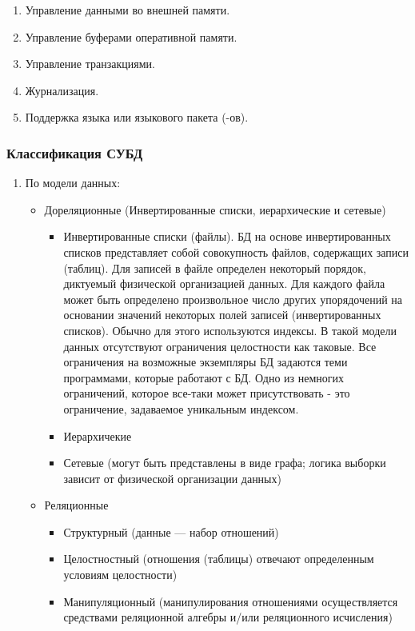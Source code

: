 \begin{enumerate}
	\item Управление данными во внешней памяти.
	\item Управление буферами оперативной памяти.
	\item Управление транзакциями.
	\item Журнализация.
	\item Поддержка языка или языкового пакета (-ов).
\end{enumerate}

\subsubsection{Классификация СУБД}
\begin{enumerate}
	\item По модели данных:
	\begin{itemize}
		\item Дореляционные (Инвертированные списки, иерархические и сетевые)
		\begin{itemize}
			\item Инвертированные списки (файлы). БД на основе инвертированных списков представляет собой совокупность файлов, содержащих записи (таблиц). Для записей в файле определен некоторый порядок, диктуемый физической организацией данных. Для каждого файла может быть определено произвольное число других упорядочений на основании значений некоторых полей записей (инвертированных списков). Обычно для этого используются индексы. В такой модели данных отсутствуют ограничения целостности как таковые. Все ограничения на возможные экземпляры БД задаются теми программами, которые работают с БД. Одно из немногих ограничений, которое все-таки может присутствовать - это ограничение, задаваемое уникальным индексом. 
			\item Иерархичекие
			\item Сетевые (могут быть представлены в виде графа; логика выборки зависит от физической организации данных)
		\end{itemize}
		\item Реляционные
		\begin{itemize}
			\item Структурный (данные --- набор отношений)
			\item Целостностный (отношения (таблицы) отвечают определенным условиям целостности)
			\item Манипуляционный (манипулирования отношениями осуществляется средствами реляционной алгебры и/или реляционного исчисления)

\end{itemize}
\end{itemize}
\end{enumerate}
